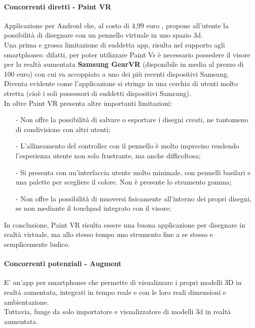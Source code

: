 \documentclass[11pt,fleqn]{book} %
\begin{document}
\paragraph{Concorrenti diretti - Paint VR}
Applicazione per Android che, al costo di 4,99 euro , propone all'utente la possibilità di disegnare con un pennello virtuale in uno spazio 3d.\\
Una prima e grossa limitazione di suddetta app, risulta nel supporto agli smartphones: difatti, per poter utilizzare Paint Vr è necessario possedere il visore per la realtà aumentata \textbf{Samsung GearVR} (disponibile in media al prezzo di 100 euro) con cui va accoppiato a uno dei più recenti dispositivi Samsung. Diventa evidente come l'applicazione si stringe in una cerchia di utenti molto stretta (cioè i soli possessori di suddetti dispositivi Samsung).\\
In oltre Paint VR presenta altre importanti limitazioni: 
\begin{itemize}
\item[-] Non offre la possibilità di salvare o esportare i disegni creati, ne tantomeno di condivisione con altri utenti;
\item[-] L'allineamento del controller con il pennello è molto impreciso rendendo l'esperienza utente non solo frustrante, ma anche difficoltosa; 
\item[-] Si presenta con un'interfaccia utente molto minimale, con pennelli basilari e una palette per scegliere il colore. Non è presente lo strumento gomma;
\item[-] Non offre la possibilità di muoversi fisicamente all'interno dei propri disegni, se non mediante il touchpad integrato con il visore;
\end{itemize}
In conclusione, Paint VR risulta essere una buona applicazione per disegnare in realtà virtuale, ma allo stesso tempo uno strumento fine a se stesso e semplicemente ludico.


\paragraph{Concorrenti potenziali - Augment}
E' un'app per smartphones che permette di visualizzare i propri modelli 3D in realtà aumentata, integrati in tempo reale e con le loro reali dimensioni e ambientazione. \\
Tuttavia, funge da solo importatore e visualizzatore di modelli 3d in realtà aumentata.
\end{document}
